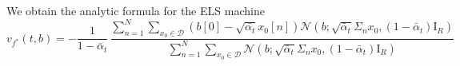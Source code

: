 \documentclass[a4paper,10pt]{article}
\theoremstyle{definition} %
\theoremstyle{definition} %
\theoremstyle{definition} %
\theoremstyle{definition} %
\newcommand{\R}{\mathbb{R}}
\newcommand{\Normal}[1]{\mathcal{N}\left( {#1} \right)}
\newcommand{\Id}{\mathrm{I}}
\newcommand{\0}{\boldsymbol{0}}
\begin{document}
We obtain the analytic formula for the ELS machine 
\begin{equation*}
    v_{f^*}(t,b) = -\frac{1}{1-\bar\alpha_t}\,\frac{\sum_{n=1}^{N}\sum_{x_0  \in \mathcal{D}} \left(b[0] -  \sqrt{\bar{\alpha_t}}x_0[n]\right) \Normal{b; \sqrt{\bar \alpha_t} \Sigma_n x_0, (1-\bar\alpha_t) \Id_R}}{\sum_{n=1}^{N}\sum_{x_0  \in \mathcal{D}} \Normal{b; \sqrt{\bar \alpha_t} \Sigma_n x_0, (1-\bar\alpha_t) \Id_R}}
\end{equation*}






\end{document}
